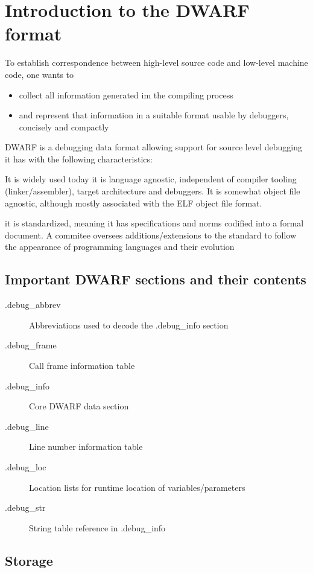 \chapter{Introduction to the DWARF format}

To establish correspondence between high-level source code and low-level machine code, one wants to
\begin{itemize}
    \item  collect all information generated im the compiling process
    \item  and represent that information in a suitable format usable by debuggers, concisely and compactly
\end{itemize}

DWARF is a debugging data format allowing support for source level debugging
it has with the following characteristics:

It is widely used today
it is language agnostic, independent of compiler tooling (linker/assembler),
target architecture and debuggers.
It is somewhat object file agnostic, although mostly associated with the ELF object file format.

it is standardized, meaning it has specifications and norms codified into
a formal document.
A commitee oversees additions/extensions to the standard to follow the
appearance of programming languages and their evolution

\section{Important DWARF sections and their contents}

\begin{description}
    \item[.debug\_abbrev] Abbreviations used to decode the .debug\_info section
    \item[.debug\_frame] Call frame information table
    \item[.debug\_info] Core DWARF data section
    \item[.debug\_line] Line number information table
    \item[.debug\_loc] Location lists for runtime location of variables/parameters
    \item[.debug\_str] String table reference in .debug\_info
\end{description}

\section{Storage}

